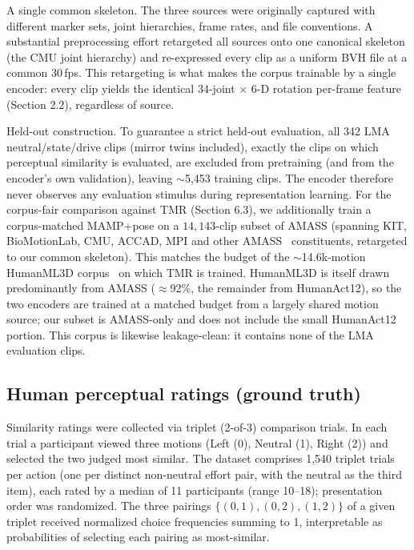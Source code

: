 \documentclass[letterpaper]{article} %
\begin{document}
{A single common skeleton.} The three sources were originally captured with different
marker sets, joint hierarchies, frame rates, and file conventions. A substantial preprocessing
effort retargeted {all} sources onto one canonical skeleton (the {CMU joint
hierarchy}) and re-expressed every clip as a uniform BVH file at a common {30\,fps}. This
retargeting is what makes the corpus trainable by a single encoder: every clip yields the
identical {34-joint $\times$ 6-D rotation} per-frame feature (Section 2.2), regardless of
source.

{Held-out construction.} To guarantee a {strict held-out evaluation}, all 342 LMA
neutral/state/drive clips (mirror twins included), exactly the clips on which perceptual
similarity is evaluated, are excluded from pretraining (and from the encoder's own validation),
leaving $\sim$5{,}453 training clips. The encoder therefore never observes any evaluation
stimulus during representation learning. For the corpus-fair comparison against TMR (Section
6.3), we additionally train a {corpus-matched} MAMP+pose on a $14{,}143$-clip subset of AMASS
(spanning KIT, BioMotionLab, CMU, ACCAD, MPI and other AMASS~\citep{mahmood2019amass} constituents,
retargeted to our common skeleton). This matches the budget of the $\sim$14.6k-motion HumanML3D
corpus~\citep{guo2022humanml3d} on which TMR is trained. HumanML3D is itself drawn predominantly from AMASS ($\approx$92\%, the remainder from
HumanAct12), so the two encoders are trained at a matched budget from a largely shared motion
source; our subset is AMASS-only and does not include the small HumanAct12 portion. This corpus
is likewise leakage-clean: it contains none of the LMA evaluation clips.

\subsection{Human perceptual ratings (ground truth)}
Similarity ratings were collected via {triplet (2-of-3) comparison trials}. In each trial
a participant viewed three motions ({Left (0)}, {Neutral (1)}, {Right
(2)}) and selected the two judged most similar. The dataset comprises {1{,}540 triplet
trials per action} (one per distinct non-neutral effort pair, with the neutral as the third
item), each rated by a {median of 11 participants} (range 10--18); presentation order was
randomized. The three pairings $\{(0,1),(0,2),(1,2)\}$ of a given triplet received normalized
choice frequencies summing to 1, interpretable as probabilities of selecting each pairing as
most-similar.
\end{document}
